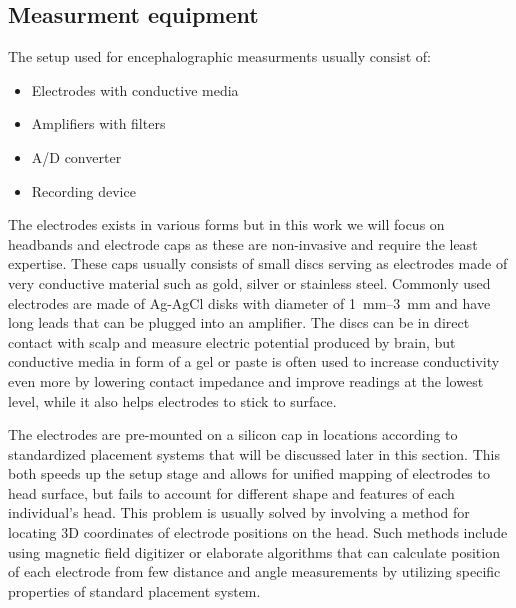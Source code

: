 \subsection{Measurment equipment}
The setup used for encephalographic measurments usually consist of: 
\begin{itemize}
  \item Electrodes with conductive media
  \item Amplifiers with filters
  \item A/D converter
  \item Recording device
\end{itemize}
The electrodes exists in various forms but in this work we will focus on
headbands and electrode caps as these are non-invasive and require the least
expertise. These caps usually consists of small discs serving as electrodes made
of very conductive material such as gold, silver or stainless steel. Commonly
used electrodes are made of Ag-AgCl disks with diameter of \SIrange[range-units
= single]{1}{3}{\mm} and have long leads that can be plugged into an
amplifier. \cite{eegFund} The discs can be in direct contact with scalp and
measure electric potential produced by brain, but conductive media in form of a
gel or paste is often used to increase conductivity even more by lowering
contact impedance and improve readings at the lowest level, while it also helps
electrodes to stick to surface.

The electrodes are pre-mounted on a silicon cap in locations according to
standardized placement systems that will be discussed later in this section.
This both speeds up the setup stage and allows for unified mapping of electrodes
to head surface, but fails to account for different shape and features of each
individual's head. \cite{eegFund} This problem is usually solved by involving a
method for locating 3D coordinates of electrode positions on the head. Such
methods include using magnetic field digitizer or elaborate algorithms that can
calculate position of each electrode from few distance and angle measurements by
utilizing specific properties of standard placement system. \cite{rapidPos}

